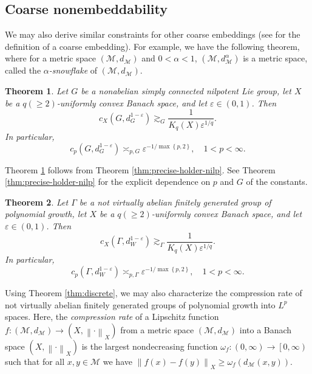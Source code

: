 \documentclass[11pt,reqno]{amsart}
\newtheorem{theorem}{Theorem}
\newcommand{\1}{\mathbf 1}
\begin{document}
\subsection{Coarse nonembeddability}\label{subsec:coarse-nonembed}
We may also derive similar constraints for other coarse embeddings (see \cite[Definition 1.36]{ostrovskii2013metric} for the definition of a coarse embedding). For example, we have the following theorem, where for a metric space $\left(\mathcal{M},d_\mathcal{M}\right)$ and $0<\alpha<1$, $\left(\mathcal{M},d_\mathcal{M}^\alpha\right)$ is a metric space, called the \emph{$\alpha$-snowflake} of $\left(\mathcal{M},d_\mathcal{M}\right)$.

\begin{theorem}\label{thm:continuous-snowflake}
Let $G$ be a nonabelian simply connected nilpotent Lie group, let $X$ be a $q(\ge 2)$-uniformly convex Banach space, and let $\varepsilon \in \left(0,1\right)$. Then
\[
c_X\left(G, d_G^{1-\varepsilon}\right)\gtrsim_{G} \frac{1}{K_q\left(X\right)\varepsilon^{1/q}}.
\]
In particular,
\[
c_p\left(G, d_G^{1-\varepsilon}\right)\asymp_{p,G} \varepsilon^{-1/\max\left\{p,2\right\}},\quad 1<p<\infty.
\]
\end{theorem}
Theorem \ref{thm:continuous-snowflake} follows from Theorem \ref{thm:precise-holder-nilp}. See Theorem \ref{thm:precise-holder-nilp} for the explicit dependence on $p$ and $G$ of the constants.

\begin{theorem}\label{thm:discrete-snowflake}
Let $\Gamma$ be a not virtually abelian finitely generated group of polynomial growth, let $X$ be a $q(\ge 2)$-uniformly convex Banach space, and let $\varepsilon \in \left(0,1\right)$. Then
\[
c_X\left(\Gamma, d_W^{1-\varepsilon}\right)\gtrsim_{\Gamma} \frac{1}{K_q\left(X\right)\varepsilon^{1/q}}.
\]
In particular,
\[
c_p\left(\Gamma, d_W^{1-\varepsilon}\right)\asymp_{p,\Gamma} \varepsilon^{-1/\max\left\{p,2\right\}},\quad 1<p<\infty.
\]
\end{theorem}


Using Theorem \ref{thm:discrete}, we may also characterize the compression rate of not virtually abelian finitely generated groups of polynomial growth into $L^p$ spaces. Here, the \emph{compression rate} of a Lipschitz function $f:\left(\mathcal{M},d_\mathcal{M}\right)\to \left(X,\left\|\cdot\right\|_X\right)$ from a metric space $\left(\mathcal{M},d_\mathcal{M}\right)$ into a Banach space $\left(X,\left\|\cdot\right\|_X\right)$ is the largest nondecreasing function $\omega_f:\left(0,\infty\right)\to \left[0,\infty\right)$ such that for all $x,y\in \mathcal{M}$ we have $\left\|f\left(x\right)-f\left(y\right)\right\|_X\ge \omega_f\left(d_\mathcal{M}\left(x,y\right)\right)$.
\end{document}
